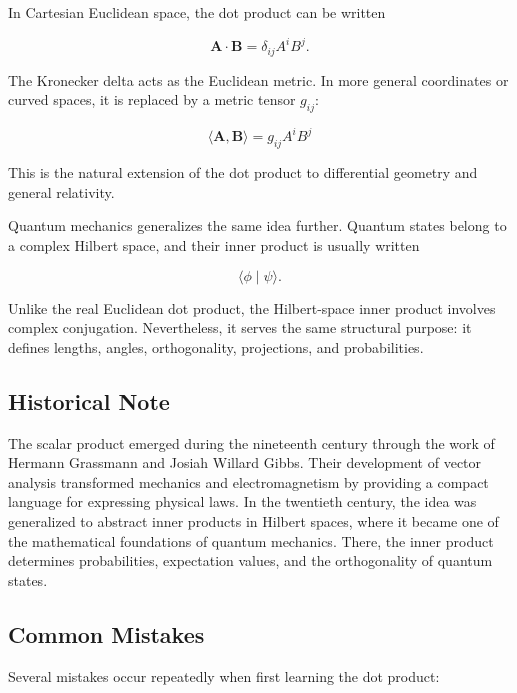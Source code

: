In Cartesian Euclidean space, the dot product can be written

\[
\mathbf A\cdot\mathbf B
=
\delta_{ij}A^iB^j.
\]

The Kronecker delta acts as the Euclidean metric. In more general coordinates or
curved spaces, it is replaced by a metric tensor $g_{ij}$:

\[
\boxed{
\langle\mathbf A,\mathbf B\rangle
=
g_{ij}A^iB^j
}
\]

This is the natural extension of the dot product to differential geometry and
general relativity.

Quantum mechanics generalizes the same idea further. Quantum states belong to a
complex Hilbert space, and their inner product is usually written

\[
\langle\phi\mid\psi\rangle.
\]

Unlike the real Euclidean dot product, the Hilbert-space inner product involves
complex conjugation. Nevertheless, it serves the same structural purpose: it
defines lengths, angles, orthogonality, projections, and probabilities.

\subsection{Historical Note}

The scalar product emerged during the nineteenth century through the work of
Hermann Grassmann and Josiah Willard Gibbs. Their development of vector analysis
transformed mechanics and electromagnetism by providing a compact language for
expressing physical laws. In the twentieth century, the idea was generalized to
abstract inner products in Hilbert spaces, where it became one of the
mathematical foundations of quantum mechanics. There, the inner product
determines probabilities, expectation values, and the orthogonality of quantum
states.

\subsection{Common Mistakes}

Several mistakes occur repeatedly when first learning the dot product:

